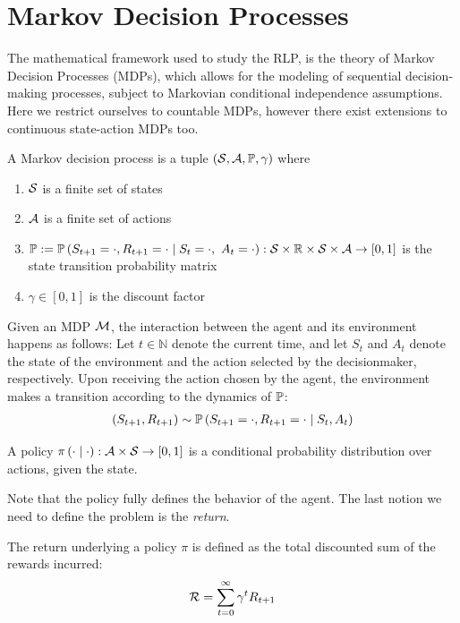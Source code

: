 \section{Markov Decision Processes}\label{sec2}
The mathematical framework used to study the RLP, is the theory of Markov Decision Processes (MDPs), which allows for the modeling of sequential decision-making processes, subject to Markovian conditional independence assumptions. Here we restrict ourselves to countable MDPs, however there exist extensions to continuous state-action MDPs too. 

\begin{definition}
A Markov decision process is a tuple $ ( \S, \A, \P, \gamma) $ where
\begin{enumerate}
  \item $\S$ is a finite set of states
  \item $\A$ is a finite set of actions
  \item $\P := \P\left(S_{t+1} = \cdot, R_{t+1} = \cdot \mid S_t = \cdot,\ A_t = \cdot \right) : \S \times \mathbb{R} \times \S \times \A \rightarrow [0,1]$ is the state   transition probability matrix
  \item $\gamma \in [0,1]$ is the discount factor
\end{enumerate}
\end{definition}

Given an MDP $\M$, the interaction between the agent and its environment happens as follows: Let $t \in \mathbb{N}$ denote the current time, and let $S_t$ and $A_t$ denote the state of the environment and the action selected by the decisionmaker, respectively.  Upon receiving the action chosen by the agent, the environment makes a transition according to the dynamics of $\P$:
\begin{align}
  \left( S_{t+1}, R_{t+1} \right) \sim \P\left( S_{t+1} = \cdot, R_{t+1} = \cdot \mid S_t, A_t \right)
\end{align}

\begin{definition}
A policy $\pi \left( \cdot \mid \cdot \right) : \A \times \S \rightarrow [0,1]$ is a conditional probability distribution over actions, given the state. 
\end{definition}

Note that the policy fully defines the behavior of the agent. The last notion we need to define the problem is the \textit{return}.

\begin{definition}
The return underlying a policy $\pi$ is defined as the total discounted sum of the rewards incurred:
\begin{align}
  \R = \sum\limits_{t=0}^{\infty} \gamma^{t} R_{t+1}
\end{align}
\end{definition}


